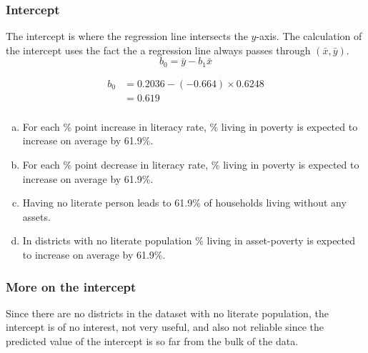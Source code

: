 \documentclass[notes,11pt, aspectratio=169]{beamer}
\begin{document}

\begin{frame}
\frametitle{Intercept}

{The intercept is where the regression line intersects the $y$-axis. The calculation of the intercept uses the fact the a regression line always passes through $(\bar{x},\bar{y})$.
\[ b_0 = \bar{y} - b_1 \bar{x} \]
}

\pause

\begin{align*}
b_0 &= 0.2036 - (-0.664) \times 0.6248 \\
&= 0.619
\end{align*}


\end{frame}


\begin{frame}
\frametitle{}


\begin{enumerate}[(a)]
\item For each \% point increase in literacy rate, \% living in poverty is expected to increase on average by 61.9\%.
\item For each \% point decrease in literacy rate, \% living in poverty is expected to increase on average by 61.9\%.
\item Having no literate person leads to 61.9\% of households living without any assets.
\item In districts with no literate population \% living in asset-poverty is expected to increase on average by 61.9\%.
\end{enumerate}

\end{frame}


\begin{frame}
\frametitle{More on the intercept}

Since there are no districts in the dataset with no literate population, the intercept is of no interest, not very useful, and also not reliable since the predicted value of the intercept is so far from the bulk of the data.


\end{frame}
\end{document}
